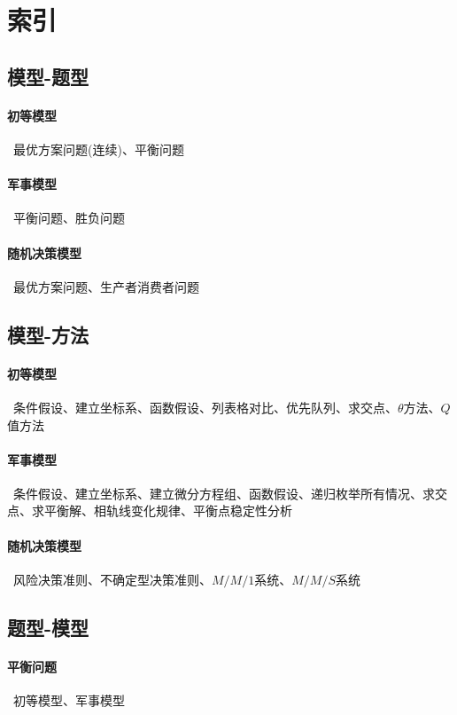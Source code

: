 \clearpage\section{索引}

\subsection{模型-题型}

  \paragraph{初等模型}~{最优方案问题(连续)、平衡问题}
  \paragraph{军事模型}~{平衡问题、胜负问题}
  \paragraph{随机决策模型}~{最优方案问题、生产者消费者问题}

\subsection{模型-方法}

  \paragraph{初等模型}~{条件假设、建立坐标系、函数假设、列表格对比、优先队列、求交点、$\theta$方法、$Q$值方法}
  \paragraph{军事模型}~{条件假设、建立坐标系、建立微分方程组、函数假设、递归枚举所有情况、求交点、求平衡解、相轨线变化规律、平衡点稳定性分析}
  \paragraph{随机决策模型}~{风险决策准则、不确定型决策准则、$M/M/1$系统、$M/M/S$系统}

\subsection{题型-模型}

  \paragraph{平衡问题}~{初等模型、军事模型}
